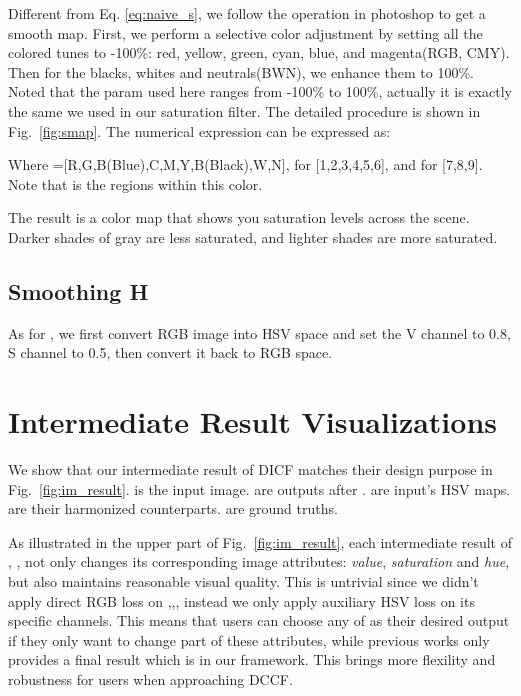\documentclass[runningheads]{llncs}
\begin{document}
Different from Eq. \ref{eq:naive_s}, we follow the operation in photoshop to get a smooth map.
First, we perform a selective color adjustment by setting all the colored tunes to -100\%: red, yellow, green, cyan, blue, and magenta(RGB, CMY).
Then for the blacks, whites and neutrals(BWN), we enhance them to 100\%. Noted that the param used here ranges from -100\% to 100\%, actually it is exactly the same  we used in our saturation filter.
The detailed procedure is shown in Fig.~\ref{fig:smap}.
The numerical expression can be expressed as:


Where =[R,G,B(Blue),C,M,Y,B(Black),W,N],  for  [1,2,3,4,5,6], and  for  [7,8,9]. 
Note that  is the regions within this color.



The result is a color map that shows you saturation levels across the scene. Darker shades of gray are less saturated, and lighter shades are more saturated.


\subsection{Smoothing H}

As for , we first convert RGB image into HSV space and set the V channel to 0.8, S channel to 0.5, then convert it back to RGB space.



\section{Intermediate Result Visualizations}
\label{intermediate}

We show that our intermediate result of DICF matches their design purpose in Fig.~\ref{fig:im_result}. 
 is the input image.  are outputs after . 
 are input's HSV maps. 
 are their harmonized counterparts.
 are ground truths.


As illustrated in the upper part of Fig.~\ref{fig:im_result}, each intermediate result of , ,  not only changes its corresponding image attributes: \textit{value}, \textit{saturation} and \textit{hue}, but also maintains reasonable visual quality.
This is untrivial since we didn't apply direct RGB loss on ,,, instead we only apply auxiliary HSV loss on its specific channels.
This means that users can choose any of  as their desired output if they only want to change part of these attributes, while previous works only provides a final result which is  in our framework.
This brings more flexility and robustness for users when approaching DCCF.
\end{document}
